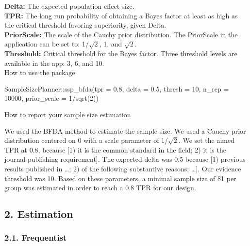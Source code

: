 \documentclass[
  english,
  man,floatsintext]{apa6}
\newenvironment{Shaded}{\begin{snugshade}}{\end{snugshade}}
\newcommand{\AttributeTok}[1]{\textcolor[rgb]{0.77,0.63,0.00}{#1}}
\newcommand{\DecValTok}[1]{\textcolor[rgb]{0.00,0.00,0.81}{#1}}
\newcommand{\FloatTok}[1]{\textcolor[rgb]{0.00,0.00,0.81}{#1}}
\newcommand{\FunctionTok}[1]{\textcolor[rgb]{0.00,0.00,0.00}{#1}}
\newcommand{\NormalTok}[1]{#1}
\newcommand{\SpecialCharTok}[1]{\textcolor[rgb]{0.00,0.00,0.00}{#1}}
\begin{document}
\textbf{Delta:} The expected population effect size.\\
\textbf{TPR:} The long run probability of obtaining a Bayes factor at least as high as the critical threshold favoring superiority, given Delta.\\
\textbf{PriorScale:} The scale of the Cauchy prior distribution. The PriorScale in the application can be set to: 1/\(\sqrt{2}\), 1, and \(\sqrt{2}\).\\
\textbf{Threshold:} Critical threshold for the Bayes factor. Three threshold levels are available in the app: 3, 6, and 10.\\

How to use the package

\begin{Shaded}
\begin{Highlighting}[]
\NormalTok{SampleSizePlanner}\SpecialCharTok{::}\FunctionTok{ssp\_bfda}\NormalTok{(}\AttributeTok{tpr =} \FloatTok{0.8}\NormalTok{, }\AttributeTok{delta =} \FloatTok{0.5}\NormalTok{, }\AttributeTok{thresh =} \DecValTok{10}\NormalTok{,}
    \AttributeTok{n\_rep =} \DecValTok{10000}\NormalTok{, }\AttributeTok{prior\_scale =} \DecValTok{1}\SpecialCharTok{/}\FunctionTok{sqrt}\NormalTok{(}\DecValTok{2}\NormalTok{))}
\end{Highlighting}
\end{Shaded}

How to report your sample size estimation

We used the BFDA method to estimate the sample size. We used a Cauchy prior distribution centered on 0 with a scale parameter of 1/\(\sqrt{2}\). We set the aimed TPR at 0.8, because {[}1) it is the common standard in the field; 2) it is the journal publishing requirement{]}. The expected delta was 0.5 because {[}1) previous results published in \ldots; 2) of the following substantive reasons: \ldots{]}. Our evidence threshold was 10. Based on these parameters, a minimal sample size of 81 per group was estimated in order to reach a 0.8 TPR for our design.

\hypertarget{estimation}{%
\subsection{2. Estimation}\label{estimation}}

\hypertarget{frequentist-1}{%
\subsubsection{2.1. Frequentist}\label{frequentist-1}}
\end{document}
